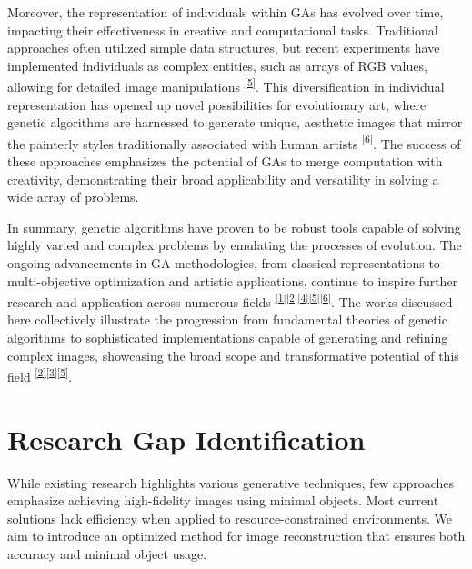 \documentclass[10pt, conference]{IEEEtran}
\begin{document}
Moreover, the representation of individuals within GAs has evolved over time, impacting their effectiveness in creative and computational tasks. Traditional approaches often utilized simple data structures, but recent experiments have implemented individuals as complex entities, such as arrays of RGB values, allowing for detailed image manipulations \hypertarget{ref}{\textsuperscript{\hyperref[sec:5r]{[5]}\label{sec:5}}}. This diversification in individual representation has opened up novel possibilities for evolutionary art, where genetic algorithms are harnessed to generate unique, aesthetic images that mirror the painterly styles traditionally associated with human artists \hypertarget{ref}{\textsuperscript{\hyperref[sec:6r]{[6]}\label{sec:6}}}. The success of these approaches emphasizes the potential of GAs to merge computation with creativity, demonstrating their broad applicability and versatility in solving a wide array of problems.

In summary, genetic algorithms have proven to be robust tools capable of solving highly varied and complex problems by emulating the processes of evolution. The ongoing advancements in GA methodologies, from classical representations to multi-objective optimization and artistic applications, continue to inspire further research and application across numerous fields \hypertarget{ref}{\textsuperscript{\hyperref[sec:1r]{[1]}\label{sec:1}}}\hypertarget{ref}{\textsuperscript{\hyperref[sec:2r]{[2]}\label{sec:2}}}\hypertarget{ref}{\textsuperscript{\hyperref[sec:4r]{[4]}\label{sec:4}}}\hypertarget{ref}{\textsuperscript{\hyperref[sec:5r]{[5]}\label{sec:5}}}\hypertarget{ref}{\textsuperscript{\hyperref[sec:6r]{[6]}\label{sec:6}}}. The works discussed here collectively illustrate the progression from fundamental theories of genetic algorithms to sophisticated implementations capable of generating and refining complex images, showcasing the broad scope and transformative potential of this field \hypertarget{ref}{\textsuperscript{\hyperref[sec:2r]{[2]}\label{sec:2}}}\hypertarget{ref}{\textsuperscript{\hyperref[sec:3r]{[3]}\label{sec:3}}}\hypertarget{ref}{\textsuperscript{\hyperref[sec:5r]{[5]}\label{sec:5}}}.

\section{Research Gap Identification}
While existing research highlights various generative techniques, few approaches emphasize achieving high-fidelity images using minimal objects. Most current solutions lack efficiency when applied to resource-constrained environments. We aim to introduce an optimized method for image reconstruction that ensures both accuracy and minimal object usage.
\end{document}
